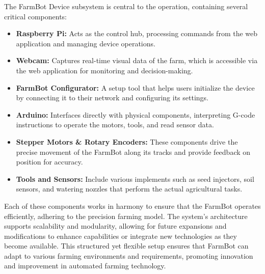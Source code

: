 The FarmBot Device subsystem is central to the operation, containing several critical components:
\begin{itemize}
    \item \textbf{Raspberry Pi:} Acts as the control hub, processing commands from the web application and managing device operations.
    \item \textbf{Webcam:} Captures real-time visual data of the farm, which is accessible via the web application for monitoring and decision-making.
    \item \textbf{FarmBot Configurator:} A setup tool that helps users initialize the device by connecting it to their network and configuring its settings.
    \item \textbf{Arduino:} Interfaces directly with physical components, interpreting G-code instructions to operate the motors, tools, and read sensor data.
    \item \textbf{Stepper Motors \& Rotary Encoders:} These components drive the precise movement of the FarmBot along its tracks and provide feedback on position for accuracy.
    \item \textbf{Tools and Sensors:} Include various implements such as seed injectors, soil sensors, and watering nozzles that perform the actual agricultural tasks.
\end{itemize}
Each of these components works in harmony to ensure that the FarmBot operates efficiently, adhering to the precision farming model. The system's architecture supports scalability and modularity, allowing for future expansions and modifications to enhance capabilities or integrate new technologies as they become available. This structured yet flexible setup ensures that FarmBot can adapt to various farming environments and requirements, promoting innovation and improvement in automated farming technology.

\newpage
